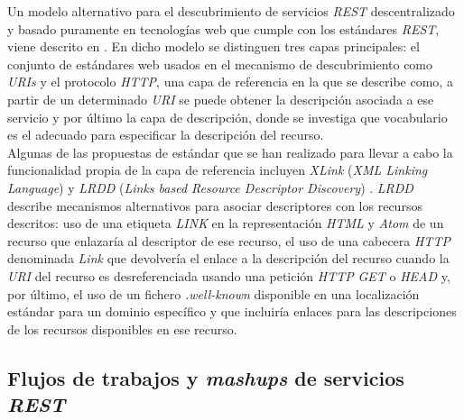 Un modelo alternativo para el descubrimiento de servicios \textit{REST} descentralizado y basado puramente en tecnolog\'ias web que cumple con los est\'andares \textit{REST}, viene descrito en \cite{umbrich2009discovering}. En dicho modelo se distinguen tres capas principales: el conjunto de est\'andares web usados en el mecanismo de descubrimiento como \textit{URIs} y el protocolo \textit{HTTP}, una capa de referencia en la que se describe como, a partir de un determinado \textit{URI} se puede obtener la descripci\'on asociada a ese servicio y por \'ultimo la capa de descripci\'on, donde se investiga que vocabulario es el adecuado para especificar la descripci\'on del recurso.\\
Algunas de las propuestas de est\'andar que se han realizado para llevar a cabo la funcionalidad propia de la capa de referencia incluyen \textit{XLink} (\textit{XML Linking Language})  y \textit{LRDD} (\textit{Links based Resource Descriptor Discovery}) \cite{lrdd}. \textit{LRDD} describe mecanismos alternativos para asociar descriptores con los recursos descritos: uso de una etiqueta \textit{LINK} en la representaci\'on \textit{HTML} y \textit{Atom} de un recurso que enlazar\'ia al descriptor de ese recurso, el uso de una cabecera \textit{HTTP} denominada \textit{Link} que devolver\'ia el enlace a la descripci\'on del recurso cuando la \textit{URI} del recurso es desreferenciada usando una petici\'on \textit{HTTP} \textit{GET} o \textit{HEAD} y, por \'ultimo, el uso de un fichero \textit{.well-known} disponible en una localizaci\'on est\'andar para un dominio espec\'ifico y que incluir\'ia enlaces para las descripciones de los recursos disponibles en ese recurso.\\

\subsection{Flujos de trabajos y \textit{mashups} de servicios \textit{REST}}

